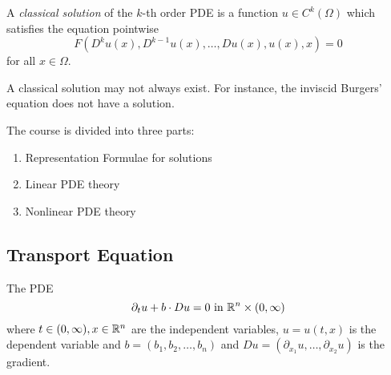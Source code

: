 \begin{definition}
    A \textit{classical solution} of the $k$-th order PDE is a function $u\in C^k (\Omega)$ which satisfies the equation pointwise
    $$F\left( D^k u(x) , D^{k-1} u(x), \ldots , Du(x), u(x),x \right) =0$$
    for all $x\in \Omega$.
    \label{def:classical-solution}
\end{definition}

\begin{remark}
    A classical solution may not always exist. For instance, the inviscid Burgers' equation does not have a solution.
\end{remark}

The course is divided into three parts:
\begin{enumerate}[label=(\alph*)]
    \item Representation Formulae for solutions
    \item Linear PDE theory
    \item Nonlinear PDE theory
\end{enumerate}

\subsection{Transport Equation}

The PDE
\begin{equation*}
    \partial_t u + b \cdot Du = 0 \text{ in } \mathbb R ^n \times (0, \infty)
\end{equation*}
where $t\in (0, \infty ), x\in \mathbb R ^n$ are the independent variables, $u=u(t,x)$ is the dependent variable and $b=\left( b_1 ,b_2 , \ldots , b_n \right)$ and $Du = \left( \partial _ {x_1} u , \ldots , \partial _{x_2} u \right)$ is the gradient.

